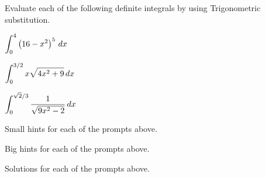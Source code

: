 \begin{activity} \label{A:5.3.2}  Evaluate each of the following definite integrals by using Trigonometric substitution.
\ba
	\item $\displaystyle \int_0^4 \left(16-x^2 \right)^5 \, dx$
	\item $\displaystyle \int_0^{3/2} x \sqrt{4x^2+9} \, dx$
	\item $\displaystyle \int_0^{\sqrt{2}/3} \frac{1}{\sqrt{9x^2-2}} \,dx$
\ea
\end{activity}
\begin{smallhint}
\ba
	\item Small hints for each of the prompts above.
\ea
\end{smallhint}
\begin{bighint}
\ba
	\item Big hints for each of the prompts above.
\ea
\end{bighint}
\begin{activitySolution}
\ba
	\item Solutions for each of the prompts above.
\ea
\end{activitySolution}
\aftera